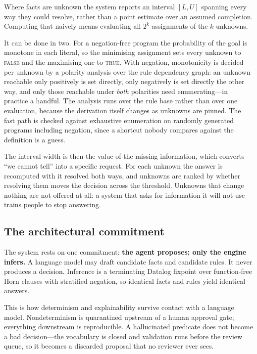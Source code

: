 \documentclass[sigconf,nonacm]{acmart}
\begin{document}
Where facts are unknown the system reports an interval $[L,U]$ spanning every
way they could resolve, rather than a point estimate over an assumed
completion. Computing that naively means evaluating all $2^{k}$ assignments of
the $k$ unknowns.

It can be done in two. For a negation-free program the probability of the goal
is monotone in each literal, so the minimising assignment sets every unknown to
\textsc{false} and the maximising one to \textsc{true}. With negation,
monotonicity is decided per unknown by a polarity analysis over the rule
dependency graph: an unknown reachable only positively is set directly, only
negatively is set directly the other way, and only those reachable under
\emph{both} polarities need enumerating---in practice a handful. The analysis
runs over the rule base rather than over one evaluation, because the derivation
itself changes as unknowns are pinned. The fast path is checked against
exhaustive enumeration on randomly generated programs including negation, since
a shortcut nobody compares against the definition is a guess.

The interval width is then the value of the missing information, which converts
``we cannot tell'' into a specific request. For each unknown the answer is
recomputed with it resolved both ways, and unknowns are ranked by whether
resolving them moves the decision across the threshold. Unknowns that change
nothing are not offered at all: a system that asks for information it will not
use trains people to stop answering.

\subsection{The architectural commitment}

The system rests on one commitment: \textbf{the agent proposes; only the engine
infers.} A language model may draft candidate facts and candidate rules. It
never produces a decision. Inference is a terminating Datalog fixpoint over
function-free Horn clauses with stratified negation, so identical facts and
rules yield identical answers.

This is how determinism and explainability survive contact with a language
model. Nondeterminism is quarantined upstream of a human approval gate;
everything downstream is reproducible. A hallucinated predicate does not become
a bad decision---the vocabulary is closed and validation runs before the review
queue, so it becomes a discarded proposal that no reviewer ever sees.
\end{document}
